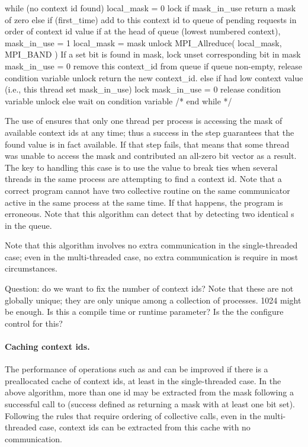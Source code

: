 \documentclass{article}
\begin{document}
\begin{algorithm}
while (no context id found) {
    local_mask = 0
    lock 
    if mask_in_use return a mask of zero
    else if (first_time) add to this context id to queue of pending
    requests in order of context id value
    if at the head of queue (lowest numbered context), 
        mask_in_use = 1
        local_mask = mask
    unlock
    MPI_Allreduce( local_mask, MPI_BAND )
    If a set bit is found in mask,
        lock
        unset corresponding bit in mask
        mask_in_use = 0
        remove this context_id from queue
        if queue non-empty, release condition variable
        unlock
        return the new context_id.
    else if had low context value (i.e., this thread set mask_in_use)
        lock
        mask_in_use = 0
        release condition variable
        unlock
    else
        wait on condition variable
    } /* end while */
\end{algorithm}
The use of  ensures that only one thread per process
is accessing the mask of available context ids at any time; thus a
success in the  step guarantees that the found
value is in fact available.  If that step fails, that means that some
thread was unable to access the mask and contributed an all-zero bit
vector as a result.  
The key to handling this case is to use the
 value to break ties when several threads
in the same process are attempting to find a context id.  Note that a
correct program cannot have two collective routine on the same
communicator active in the same process at the same time.  If that
happens, the program is erroneous.  Note that this algorithm can
detect that by detecting two identical s in the
queue.

Note that this algorithm involves no extra communication in the
single-threaded case; even in the multi-threaded case, no extra
communication is require in most circumstances.

Question: do we want to fix the number of context ids?  Note that
these are not globally unique; they are only unique among a collection
of processes.  1024 might be enough.  Is this a compile time or
runtime parameter?  Is the  the configure
control for this?

\paragraph{Caching context ids.} 
The performance of operations such as  and
 can be improved if there is a preallocated cache of
context ids, at least in the single-threaded case.  In the above
algorithm, more than one id may be extracted from the mask following a
successful call to  (success defined as
returning a mask with at least one bit set).  Following the rules that
require ordering of collective calls, even in the multi-threaded case,
context ids can be extracted from this cache with no communication.
\end{document}
